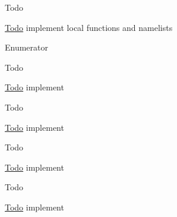 \begin{DoxyRefDesc}{Todo}
\item[\hyperlink{todo__todo000005}{Todo}]implement local functions and namelists \end{DoxyRefDesc}
\begin{Desc}
\item[Enumerator]\par
\begin{description}
\item[{\em 
\hypertarget{classNode_a8dad370be1595f49e0a7c2406a91e867a8fb6b35a2762acd63c8d42fc8575889e}{}Variable\+List\label{classNode_a8dad370be1595f49e0a7c2406a91e867a8fb6b35a2762acd63c8d42fc8575889e}
}]\begin{DoxyRefDesc}{Todo}
\item[\hyperlink{todo__todo000006}{Todo}]implement \end{DoxyRefDesc}
\item[{\em 
\hypertarget{classNode_a8dad370be1595f49e0a7c2406a91e867a496a823a62742a6ebb9f4fb757e02ce4}{}Function\+Name\label{classNode_a8dad370be1595f49e0a7c2406a91e867a496a823a62742a6ebb9f4fb757e02ce4}
}]\begin{DoxyRefDesc}{Todo}
\item[\hyperlink{todo__todo000007}{Todo}]implement \end{DoxyRefDesc}
\item[{\em 
\hypertarget{classNode_a8dad370be1595f49e0a7c2406a91e867a1a3ec9cbafad290cdd86122121b61391}{}List\+Name\label{classNode_a8dad370be1595f49e0a7c2406a91e867a1a3ec9cbafad290cdd86122121b61391}
}]\begin{DoxyRefDesc}{Todo}
\item[\hyperlink{todo__todo000008}{Todo}]implement \end{DoxyRefDesc}
\item[{\em 
\hypertarget{classNode_a8dad370be1595f49e0a7c2406a91e867a82f82cd405ee2ded93d8f9133e2f5f34}{}Stat\label{classNode_a8dad370be1595f49e0a7c2406a91e867a82f82cd405ee2ded93d8f9133e2f5f34}
}]\begin{DoxyRefDesc}{Todo}
\item[\hyperlink{todo__todo000009}{Todo}]implement \end{DoxyRefDesc}

\end{description}
\end{Desc}
